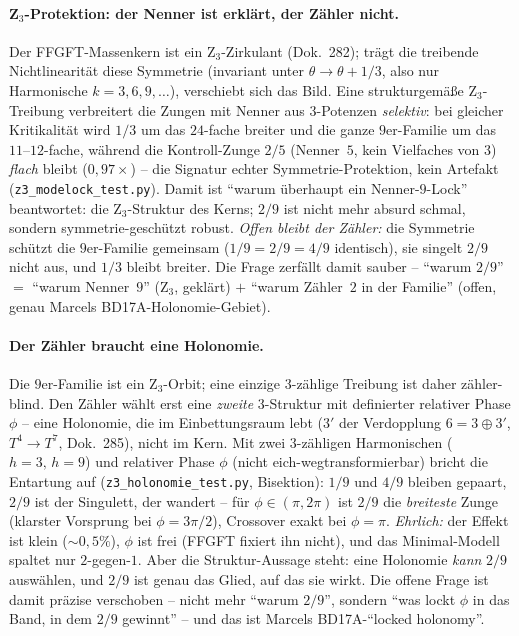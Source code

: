 \paragraph{Z$_3$-Protektion: der Nenner ist erklärt, der Zähler nicht.} Der FFGFT-Massenkern ist ein
Z$_3$-Zirkulant (Dok.~282); trägt die treibende Nichtlinearität diese Symmetrie (invariant unter
$\theta\!\to\!\theta+1/3$, also nur Harmonische $k=3,6,9,\dots$), verschiebt sich das Bild. Eine
strukturgemäße Z$_3$-Treibung verbreitert die Zungen mit Nenner aus $3$-Potenzen \emph{selektiv}: bei
gleicher Kritikalität wird $1/3$ um das $24$-fache breiter und die ganze $9$er-Familie um das
$11$--$12$-fache, während die Kontroll-Zunge $2/5$ (Nenner~$5$, kein Vielfaches von $3$) \emph{flach}
bleibt ($0{,}97\times$) -- die Signatur echter Symmetrie-Protektion, kein Artefakt
(\texttt{z3\_modelock\_test.py}). Damit ist \enquote{warum überhaupt ein Nenner-$9$-Lock} beantwortet:
die Z$_3$-Struktur des Kerns; $2/9$ ist nicht mehr absurd schmal, sondern symmetrie-geschützt robust.
\emph{Offen bleibt der Zähler:} die Symmetrie schützt die $9$er-Familie gemeinsam ($1/9=2/9=4/9$
identisch), sie singelt $2/9$ nicht aus, und $1/3$ bleibt breiter. Die Frage zerfällt damit sauber --
\enquote{warum $2/9$} $=$ \enquote{warum Nenner~$9$} (Z$_3$, geklärt) $+$ \enquote{warum Zähler~$2$ in
der Familie} (offen, genau Marcels BD17A-Holonomie-Gebiet).

\paragraph{Der Zähler braucht eine Holonomie.} Die $9$er-Familie ist ein Z$_3$-Orbit; eine einzige
$3$-zählige Treibung ist daher zähler-blind. Den Zähler wählt erst eine \emph{zweite} $3$-Struktur mit
definierter relativer Phase $\phi$ -- eine Holonomie, die im Einbettungsraum lebt ($3'$ der Verdopplung
$6=3\oplus3'$, $T^4\!\to\!T^7$, Dok.~285), nicht im Kern. Mit zwei $3$-zähligen Harmonischen
($h{=}3,\,h{=}9$) und relativer Phase $\phi$ (nicht eich-wegtransformierbar) bricht die Entartung auf
(\texttt{z3\_holonomie\_test.py}, Bisektion): $1/9$ und $4/9$ bleiben gepaart, $2/9$ ist der Singulett,
der wandert -- für $\phi\in(\pi,2\pi)$ ist $2/9$ die \emph{breiteste} Zunge (klarster Vorsprung bei
$\phi=3\pi/2$), Crossover exakt bei $\phi=\pi$. \emph{Ehrlich:} der Effekt ist klein ($\sim\!0{,}5\%$),
$\phi$ ist frei (FFGFT fixiert ihn nicht), und das Minimal-Modell spaltet nur $2$-gegen-$1$. Aber die
Struktur-Aussage steht: eine Holonomie \emph{kann} $2/9$ auswählen, und $2/9$ ist genau das Glied, auf
das sie wirkt. Die offene Frage ist damit präzise verschoben -- nicht mehr \enquote{warum $2/9$},
sondern \enquote{was lockt $\phi$ in das Band, in dem $2/9$ gewinnt} -- und das ist Marcels
BD17A-\enquote{locked holonomy}.

